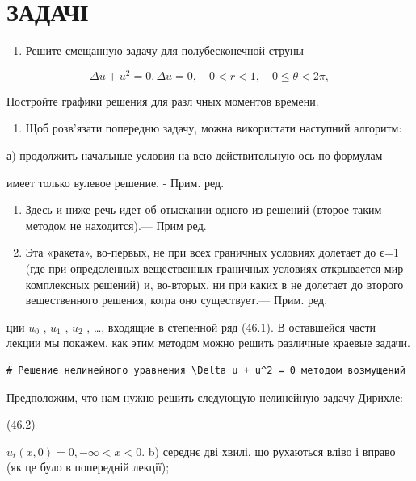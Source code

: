 \documentclass[
  ukrainian,
]{article}
\providecommand{\tightlist}{%
  \setlength{\itemsep}{0pt}\setlength{\parskip}{0pt}}
\begin{document}
\section{ЗАДАЧІ}\label{ux437ux430ux434ux430ux447ux456}

\begin{enumerate}
\def\labelenumi{\arabic{enumi}.}
\tightlist
\item
  Решите смещанную задачу для полубесконечной струны
\end{enumerate}

\[
\Delta u + u^2 = 0,
\Delta u = 0, \quad 0 < r < 1, \quad 0 \le \theta < 2\pi,
\]

Постройте графики решения для разл чных моментов времени.

\begin{enumerate}
\def\labelenumi{\arabic{enumi}.}
\setcounter{enumi}{1}
\tightlist
\item
  Щоб розв'язати попередню задачу, можна використати наступний алгоритм:
\end{enumerate}

а) продолжить начальные условия на всю действительную ось по формулам

имеет только вулевое решение. - Прим. ред.

\begin{enumerate}
\def\labelenumi{\arabic{enumi})}
\setcounter{enumi}{1}
\item
  Здесь и ниже речь идет об отыскании одного из решений (второе таким
  методом не находится).--- Прим ред.
\item
  Эта «ракета», во-первых, не при всех граничных условиях долетает до
  є=1 (где при опредсленных вещественных граничных условиях открывается
  мир комплексных решений) и, во-вторых, ни при каких в не долетает до
  второго вещественного решения, когда оно существует.--- Прим. ред.
\end{enumerate}

ции \(u_0\) , \(u_1\) , \(u_2\) , \ldots, входящие в степенной ряд
(46.1). В оставшейся части лекции мы покажем, как этим методом можно
решить различные краевые задачи.

\begin{verbatim}
# Решение нелинейного уравнения \Delta u + u^2 = 0 методом возмущений
\end{verbatim}

Предположим, что нам нужно решить следующую нелинейную задачу Дирихле:

(46.2)

\(u_t(x, 0) = 0, -\infty < x < 0.\) b) середнє дві хвилі, що рухаються
вліво і вправо (як це було в попередній лекції);
\end{document}
